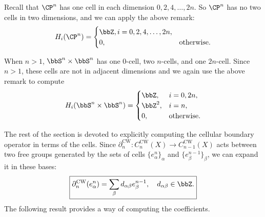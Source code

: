 \begin{example}
    Recall that $\CP^n$ has one cell in each dimension $0,2,4,\ldots,2n$. So $\CP^n$ has no two cells in two dimensions, and we can apply the above remark:
    \[H_i(\CP^n)=\begin{cases}
        \bbZ, i=0,2,4,\ldots,2n,\\
        0,&\text{otherwise}.
    \end{cases}\]
\end{example}
\begin{example}
    When $n>1$, $\bbS^n\times \bbS^n$ has one $0$-cell, two $n$-cells, and one $2n$-cell. Since $n>1$, these cells are not in adjacent dimensions and we again use the above remark to compute
    \[H_i(\bbS^n\times \bbS^n)=\begin{cases}
        \bbZ,& i=0,2n,\\
        \bbZ^2,&i=n,\\
        0,&\text{otherwise}.
    \end{cases}\]
\end{example}


The rest of the section is devoted to explicitly computing the cellular boundary operator in terms of the cells. Since $\partial_n^{\mathrm{CW}}:C_n^{\mathrm{CW}}(X)\to C_{n-1}^{\mathrm{CW}}(X)$ acts between two free groups generated by the sets of cells $\{e^n_\alpha\}_\alpha$ and $\{e^{n-1}_\beta\}_\beta$, we can expand it in these bases:
\[\boxed{\partial_n^{\mathrm{CW}}(e_\alpha^n)=\sum_\beta d_{\alpha\beta}e_\beta^{n-1},\quad d_{\alpha\beta}\in\bbZ.}\]
The following result provides a way of computing the coefficients.

